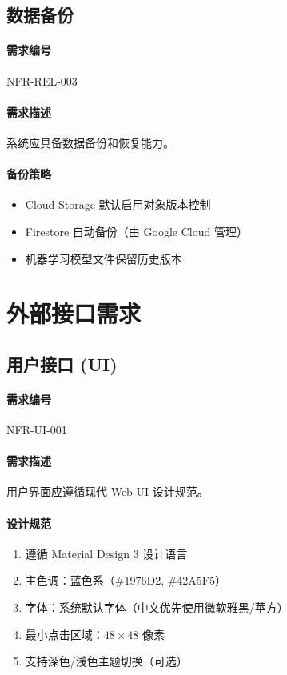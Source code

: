 \subsection{数据备份}

\paragraph{需求编号} NFR-REL-003

\paragraph{需求描述} 系统应具备数据备份和恢复能力。

\paragraph{备份策略}
\begin{itemize}
    \item Cloud Storage 默认启用对象版本控制
    \item Firestore 自动备份（由 Google Cloud 管理）
    \item 机器学习模型文件保留历史版本
\end{itemize}

\section{外部接口需求}

\subsection{用户接口 (UI)}

\paragraph{需求编号} NFR-UI-001

\paragraph{需求描述} 用户界面应遵循现代 Web UI 设计规范。

\paragraph{设计规范}
\begin{enumerate}
    \item 遵循 Material Design 3 设计语言
    \item 主色调：蓝色系（\#1976D2, \#42A5F5）
    \item 字体：系统默认字体（中文优先使用微软雅黑/苹方）
    \item 最小点击区域：$48 \times 48$ 像素
    \item 支持深色/浅色主题切换（可选）
\end{enumerate}

